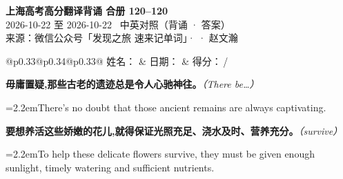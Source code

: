 \documentclass[11pt,a4paper]{article}
\newcommand{\num}[1]{\makebox[1.9em][r]{#1.}\hspace{0.3em}}
\newcommand{\prompt}[1]{\emph{\textcolor{tipblue}{\small（#1）}}}
\begin{document}
\pagestyle{plain}
\begin{center}
{\LARGE\bfseries 上海高考高分翻译背诵 \quad 合册 120–120}\\[0.25em]
{\large 2026-10-22 至 2026-10-22 \quad\ 中英对照（背诵 · 答案）}\\[0.35em]
{\footnotesize 来源：微信公众号「发现之旅 速来记单词」·  · 赵文瀚}
\end{center}

\vspace{0.4em}
\noindent\begin{tabular}{@{}p{0.33\textwidth}@{}p{0.34\textwidth}@{}p{0.33\textwidth}@{}}
姓名：\underline{\hspace{2.0cm}} & 日期：\underline{\hspace{2.0cm}} & 得分：\underline{\hspace{1.4cm}}\,/ \\
\end{tabular}

\vspace{0.5em}

\vspace{0.8em}
\vspace{0.35em}\vspace{0.15em}

\begin{minipage}{\linewidth}

\num{1}\textbf{毋庸置疑,那些古老的遗迹总是令人心驰神往。}\prompt{There be…}

\vspace{0.15em}

\noindent\hangindent=2.2em\hspace{2.2em}There’s no doubt that those ancient remains are always captivating.

\end{minipage}

\begin{minipage}{\linewidth}

\num{2}\textbf{要想养活这些娇嫩的花儿,就得保证光照充足、浇水及时、营养充分。}\prompt{survive}

\vspace{0.15em}

\noindent\hangindent=2.2em\hspace{2.2em}To help these delicate flowers survive, they must be given enough sunlight, timely watering and sufficient nutrients.

\end{minipage}
\end{document}
